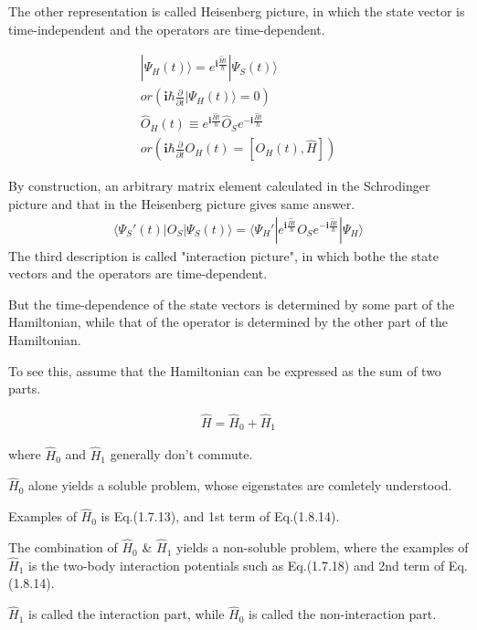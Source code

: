 ﻿\documentclass[twoside]{book}
\numberwithin{equation}{section}
\begin{document}
 The other representation is called Heisenberg picture, in which the state vector is time-independent and the operators are time-dependent.

\begin{align}
| \Psi_H(t)\rangle=e^{\bm{i}  \frac{\hat Ht}{\hbar}}| \Psi_S(t)\rangle  \\
or\left( \bm{i} \hbar \frac{\partial}{\partial t}| \Psi_H(t)\rangle=0\right) \nonumber \\
\hat O_H(t) \equiv e^{\bm{i}  \frac{\hat Ht}{\hbar}}\hat O_S e^{-\bm{i}  \frac{\hat Ht}{\hbar}} \\
or \left( \bm{i} \hbar \frac{\partial}{\partial t}  O_H(t)=[ O_H(t), \hat H] \right)\nonumber
\end{align}

 By construction, an arbitrary matrix element calculated in the Schrodinger picture and that in the Heisenberg picture gives same answer.
\begin{align}
\langle\Psi_S'(t)|O_S|\Psi_S(t)\rangle=\langle\Psi_H'|e^{\bm{i}  \frac{\hat Ht}{\hbar}}O_Se^{-\bm{i}  \frac{\hat Ht}{\hbar}}|\Psi_H\rangle \nonumber
\end{align}
 The third description is called "interaction picture", in which bothe the state vectors and the operators are time-dependent.

 But the time-dependence of the state vectors is determined by some part of the Hamiltonian, while that of the operator is determined by the other part of the Hamiltonian.

 To see this, assume  that the Hamiltonian can be expressed as the sum of two parts.

\begin{align}
\hat H=\hat H_0+\hat H_1 \nonumber
\end{align}

  where $\hat H_0$ and $\hat H_1$ generally don't commute.

 $\hat H_0$ alone yields a soluble problem, whose eigenstates are comletely understood.

 Examples of $\hat H_0$ is Eq.(1.7.13), and 1st term of Eq.(1.8.14).

 The combination of $\hat H_0$ \& $\hat H_1$ yields a non-soluble problem, where the examples of $\hat H_1$ is the two-body interaction potentials such as Eq.(1.7.18) and 2nd term of Eq.(1.8.14).

 $\hat H_1$ is called the interaction part, while $\hat H_0$ is called the non-interaction part.
\end{document}
